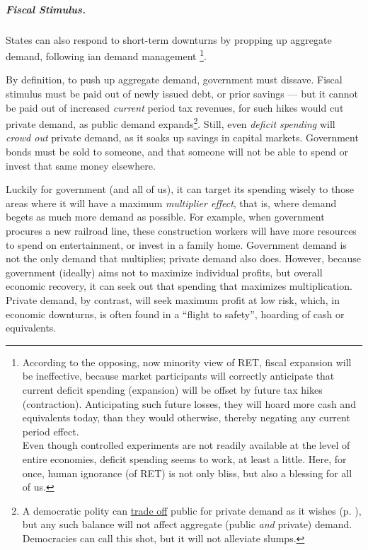 \subparagraph{Fiscal Stimulus.}  \label{sec:fiscalstimulus}
States can also respond to short-term downturns by propping up aggregate demand, following \citeauthor{Keynes1936}ian demand management \footnote{
	According to the opposing, now minority view of \gls{RET}, fiscal expansion will be ineffective, because market participants will correctly anticipate that current deficit spending (expansion) will be offset by future tax hikes (contraction). Anticipating such future losses, they will hoard more cash and equivalents today, than they would otherwise, thereby negating any current period effect.\\ Even though controlled experiments are not readily available at the level of entire economies, deficit spending seems to work, at least a little. Here, for once, human ignorance (of \gls{RET}) is not only bliss, but also a blessing for all of us.}.

By definition, to push up aggregate demand, government must dissave. Fiscal stimulus must be paid out of newly issued debt, or prior savings --- but it cannot be paid out of increased \emph{current} period tax revenues, for such hikes would cut private demand, as public demand expands\footnote{
	A democratic polity can \hyperref[sec:tradeoffs]{trade off} public for private demand as it wishes (p. \pageref{sec:tradeoffs}), but any such balance will not affect aggregate (public \emph{and} private) demand. Democracies can call this shot, but it will not alleviate slumps.}. 
Still, even \emph{deficit spending} will \emph{crowd out} private demand, as it soaks up savings in capital markets. Government bonds must be sold to someone, and that someone will not be able to spend or invest that same money elsewhere.

Luckily for government (and all of us), it can target its spending wisely to those areas where it will have a maximum \emph{multiplier effect}, that is, where demand begets as much more demand as possible. For example, when government procures a new railroad line, these construction workers will have more resources to spend on entertainment, or invest in a family home. Government demand is not the only demand that multiplies; private demand also does. However, because government (ideally) aims not to maximize individual profits, but overall economic recovery, it can seek out that spending that maximizes multiplication. Private demand, by contrast, will seek maximum profit at low risk, which, in economic downturns, is often found in a ``flight to safety'', hoarding of cash or equivalents.

